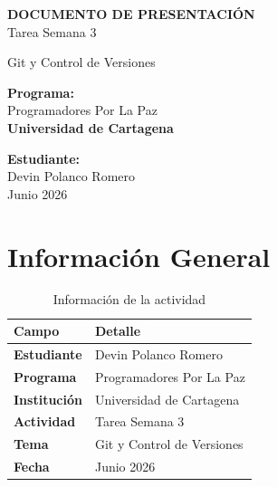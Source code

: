 \documentclass[12pt,a4paper]{article}
\begin{document}
\begin{titlepage}
    \centering
    \vspace*{2cm}
    
    {\Huge\bfseries\textcolor{azulgit}{DOCUMENTO DE PRESENTACIÓN}\\[0.5cm]}
    {\Large\textcolor{azulgit!70!black}{Tarea Semana 3}}\\[1cm]
    
    \vspace{1cm}
    
    {\Large Git y Control de Versiones}\\[2cm]
    
    \vspace{2cm}
    
    {\large\textbf{Programa:}}\\
    {\large Programadores Por La Paz}\\[1.5cm]
    
    {\large\textbf{Universidad de Cartagena}}\\[2cm]
    
    \vfill
    
    {\large\textbf{Estudiante:}}\\
    {\Large Devin Polanco Romero}\\[1cm]
    
    {\large Junio 2026}
    
\end{titlepage}

\tableofcontents
\newpage

\section{Información General}

\begin{table}[h]
\centering
\begin{tabular}{|>{\bfseries}l|l|}
\hline
\textbf{Campo} & \textbf{Detalle} \\
\hline
Estudiante & Devin Polanco Romero \\
\hline
Programa & Programadores Por La Paz \\
\hline
Institución & Universidad de Cartagena \\
\hline
Actividad & Tarea Semana 3 \\
\hline
Tema & Git y Control de Versiones \\
\hline
Fecha & Junio 2026 \\
\hline
\end{tabular}
\caption{Información de la actividad}
\end{table}
\end{document}
